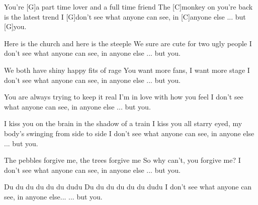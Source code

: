 You're [G]a part time lover and a full time friend
The [C]monkey on you're back is the latest trend
I [G]don't see what anyone can see, in [C]anyone else
... but [G]you.

Here is the church and here is the steeple
We sure are cute for two ugly people
I don't see what anyone can see, in anyone else
... but you.

We both have shiny happy fits of rage
You want more fans, I want more stage
I don't see what anyone can see, in anyone else
... but you.

You are always trying to keep it real
I'm in love with how you feel
I don't see what anyone can see, in anyone else
... but you.

I kiss you on the brain in the shadow of a train
I kiss you all starry eyed, my body's swinging from side to side
I don't see what anyone can see, in anyone else
... but you.

The pebbles forgive me, the trees forgive me
So why can't, you forgive me?
I don't see what anyone can see, in anyone else
... but you.

Du du du du du du dudu
Du du du du du du dudu
I don't see what anyone can see, in anyone else...
... but you.


